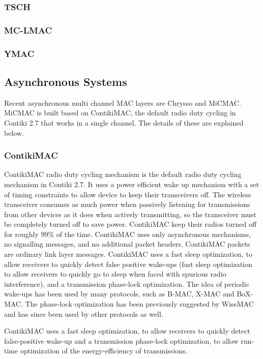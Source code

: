 \subsubsection{TSCH}

\subsubsection{MC-LMAC}

\subsubsection{YMAC}

\subsection{Asynchronous Systems}
Recent asynchronous multi channel MAC layers are Chrysso and MiCMAC. MiCMAC is built based on ContikiMAC, the default radio duty cycling in Contiki 2.7 that works in a single channel. The details of these are explained below.

\subsubsection{ContikiMAC}
ContikiMAC radio duty cycling mechanism is the default radio duty cycling mechanism in Contiki 2.7. It uses a power efficient wake up mechanism with a set of timing constraints to allow device to keep their transceivers off. The wireless transceiver consumes as much power when passively listening for transmissions from other devices as it does when actively transmitting, so the transceiver must be completely turned off to save power. ContikiMAC keep their radios turned off for roughly 99\% of the time.  ContikiMAC uses only asynchronous mechanisms, no signalling messages, and no additional packet headers. ContikiMAC packets are ordinary link layer messages. ContikiMAC uses a fast sleep optimization, to allow receivers to quickly detect false positive wake-ups (fast sleep optimization to allow receivers to quickly go to sleep when faced with spurious radio interference), and a transmission phase-lock optimization. The idea of periodic wake-ups has been used by many protocols, such as B-MAC, X-MAC and BoX-MAC. The phase-lock optimization has been previously suggested by WiseMAC and has since been used by other protocols as well. 

ContikiMAC uses a fast sleep optimization, to allow receivers to quickly detect false-positive wake-up and a transmission phase-lock optimization, to allow run-time optimization of the energy-efficiency of transmissions. 

